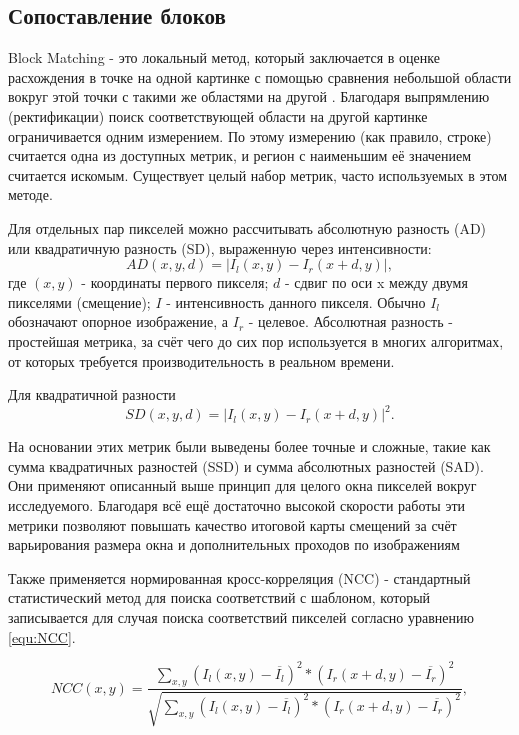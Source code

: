 \subsection{Сопоставление блоков}
Block Matching - это локальный метод, который заключается в оценке расхождения в точке на одной картинке с помощью сравнения небольшой области вокруг этой точки с такими же областями 
на другой \cite{}. Благодаря выпрямлению (ректификации) поиск соответствующей области на другой картинке ограничивается одним измерением. По этому измерению (как правило, строке) 
считается одна из доступных метрик, и регион с наименьшим её значением считается искомым. Существует целый набор метрик, часто используемых в этом методе. 

Для отдельных пар пикселей можно рассчитывать абсолютную разность (AD) или квадратичную разность (SD), выраженную через интенсивности:
\begin{equation}
	AD(x, y, d) = |I_l(x,y) - I_r(x+d, y)|,			
	\label{eq:AD}
\end{equation}
где $(x, y)$ - координаты первого пикселя; $d$ - сдвиг по оси x между двумя пикселями (смещение); $I$ - интенсивность данного пикселя. Обычно $I_l$ обозначают опорное изображение, а $I_r$ - 
целевое. Абсолютная разность - простейшая метрика, за счёт чего до сих пор используется в многих алгоритмах, от которых требуется производительность в реальном времени. 

Для квадратичной разности 
\begin{equation}
	SD(x, y, d) = |I_l(x,y) - I_r(x+d, y)|^2.		
	\label{eq:SD}
\end{equation}

На основании этих метрик были выведены более точные и сложные, такие как сумма квадратичных разностей (SSD) и сумма абсолютных разностей (SAD). Они применяют описанный выше принцип для целого 
окна пикселей вокруг исследуемого.  Благодаря всё ещё достаточно высокой скорости работы эти метрики позволяют повышать качество итоговой карты смещений за счёт варьирования размера окна и 
дополнительных проходов по изображениям \cite{twosizewindow} 

Также применяется нормированная кросс-корреляция (NCC) - стандартный статистический метод для поиска соответствий с шаблоном, который записывается для случая поиска соответствий пикселей 
согласно уравнению \ref{equ:NCC}.

\begin{equation}
	NCC(x, y) = \frac{ \sum_{x, y}^{} (I_l(x, y) - \overline{I_l} )^2 * ( I_r(x + d, y) - \overline{I_r} )^2   }{ \sqrt{ \sum_{x, y}^{} (I_l(x, y) - \overline{I_l} )^2 * ( I_r(x + d, y) - \overline{I_r} )^2 }  }, 
	\label{equ:NCC}
\end{equation}

